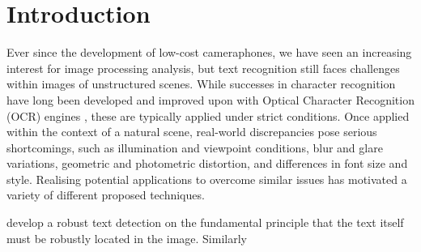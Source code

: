 \chapter{Introduction}
\label{ch:introduction}

Ever since the development of low-cost cameraphones, we have seen an increasing interest for image processing analysis, but text recognition still faces challenges within images of unstructured scenes. While successes in character recognition have long been developed and improved upon with Optical Character Recognition (OCR) engines \citep{Smith:1987tg}, these are typically applied under strict conditions. Once applied within the context of a natural scene, real-world discrepancies pose serious shortcomings, such as illumination and viewpoint conditions, blur and glare variations, geometric and photometric distortion, and differences in font size and style. Realising potential applications to overcome similar issues has motivated a variety of different proposed techniques. 

\citet{Chen:2011ul} develop a robust text detection on the fundamental principle that the text itself must be robustly located in the image. Similarly




